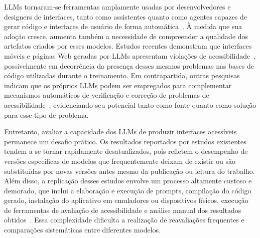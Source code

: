 \documentclass[sigconf,anonymous,review]{webmedia}
\begin{document}

LLMs tornaram-se ferramentas amplamente usadas por desenvolvedores e designers de interfaces, tanto como assistentes quanto como agentes capazes de gerar código e interfaces de usuário de forma automática~\cite{peng2023copilot, fagundes2025evaluating}. À medida que sua adoção cresce, aumenta também a necessidade de compreender a qualidade dos artefatos criados por esses modelos. Estudos recentes demonstram que interfaces móveis e páginas Web geradas por LLMs apresentam violações de acessibilidade~\cite{suh2025human,anonref3,anonref1}, possivelmente em decorrência da presença desses mesmos problemas nas bases de código utilizadas durante o treinamento. Em contrapartida, outras pesquisas indicam que os próprios LLMs podem ser empregados para complementar mecanismos automáticos de verificação e correção de problemas de acessibilidade~\cite{fathallah2025accessguru,xavier2025image}, evidenciando seu potencial tanto como fonte quanto como solução para esse tipo de problema.

Entretanto, avaliar a capacidade dos LLMs de produzir interfaces acessíveis permanece um desafio prático. Os resultados reportados por estudos existentes tendem a se tornar rapidamente desatualizados, pois refletem o desempenho de versões específicas de modelos que frequentemente deixam de existir ou são substituídas por novas versões antes mesmo da publicação ou leitura do trabalho. Além disso, a replicação desses estudos envolve um processo altamente custoso e demorado, que inclui a elaboração e execução de prompts, compilação do código gerado, instalação do aplicativo em emuladores ou dispositivos físicos, execução de ferramentas de avaliação de acessibilidade e análise manual dos resultados obtidos~\cite{anonref1}. Essa complexidade dificulta a realização de reavaliações frequentes e comparações sistemáticas entre diferentes modelos.
\end{document}

